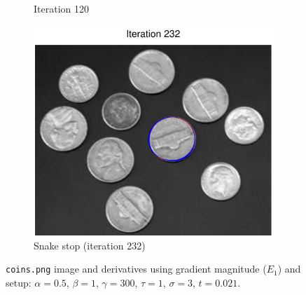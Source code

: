 \documentclass[11pt,a4paper]{article}
\begin{document}
\begin{figure}[H]
\begin{subfigure}[t]{0.24\textwidth}
        \caption{Iteration 120}
        \label{fig:coins_120}
    \end{subfigure}
    \begin{subfigure}[t]{0.24\textwidth}
        \includegraphics[width=\textwidth]{src/images/coins_gradient_232.pdf}
        \caption{Snake stop (iteration 232)}
        \label{fig:coins_232}
    \end{subfigure}
    \caption{\texttt{coins.png} image and derivatives using gradient magnitude
($E_1$) and setup: $\alpha = 0.5$, $\beta = 1$, $\gamma = 300$, $\tau = 1$,
$\sigma = 3$, $t = 0.021$.}
    \label{fig:coins}
\end{figure}
\end{document}
